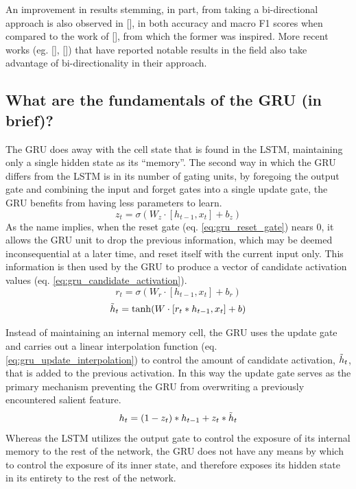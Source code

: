 \documentclass[12pt, a4paper]{report}
\theoremstyle{definition}
\theoremstyle{definition}%
\theoremstyle{definition}%
\theoremstyle{definition}%
\theoremstyle{definition}%
\theoremstyle{definition}%
\renewcommand{\cite}[1]{[\citealp{#1}]}
\begin{document}
An improvement in results stemming, in part, from taking a bi-directional approach is also observed in \cite{zhang2016}, in both accuracy and macro F1 scores when compared to the work of \cite{vo2015}, from which the former was inspired. More recent works (eg. \cite{ma2018}, \cite{zheng2018}) that have reported notable results in the field also take advantage of bi-directionality in their approach. 

\subsection{What are the fundamentals of the GRU (in brief)?}
The GRU does away with the cell state that is found in the LSTM, maintaining only a single hidden state as its \enquote{memory}. The second way in which the GRU differs from the LSTM is in its number of gating units, by foregoing the output gate and combining the input and forget gates into a single update gate, the GRU benefits from having less parameters to learn.
\begin{equation} \label{eq:gru_update_gate}
    z_t = \sigma(W_z\cdot[h_{t-1},x_t] + b_z)
\end{equation}
As the name implies, when the reset gate (eq. \ref{eq:gru_reset_gate}) nears $0$, it allows the GRU unit to drop the previous information, which may be deemed inconsequential at a later time, and reset itself with the current input only. This information is then used by the GRU to produce a vector of candidate activation values (eq. \ref{eq:gru_candidate_activation}).
\begin{equation} \label{eq:gru_reset_gate}
    r_t = \sigma(W_r\cdot[h_{t-1},x_t] + b_r)
\end{equation}
\begin{equation} \label{eq:gru_candidate_activation}
    \Tilde{h}_t = \tanh(W\cdot[r_t * h_{t-1},x_t] + b)
\end{equation}

Instead of maintaining an internal memory cell, the GRU uses the update gate and carries out a linear interpolation function (eq. \ref{eq:gru_update_interpolation}) to control the amount of candidate activation, $\Tilde{h}_t$, that is added to the previous activation. In this way the update gate serves as the primary mechanism preventing the GRU from overwriting a previously encountered salient feature. 
\begin{equation} \label{eq:gru_update_interpolation}
    h_t = (1-z_t)*h_{t-1} + z_t*\Tilde{h}_t
\end{equation}
Whereas the LSTM utilizes the output gate to control the exposure of its internal memory to the rest of the network, the GRU does not have any means by which to control the exposure of its inner state, and therefore exposes its hidden state in its entirety to the rest of the network.  
\end{document}
